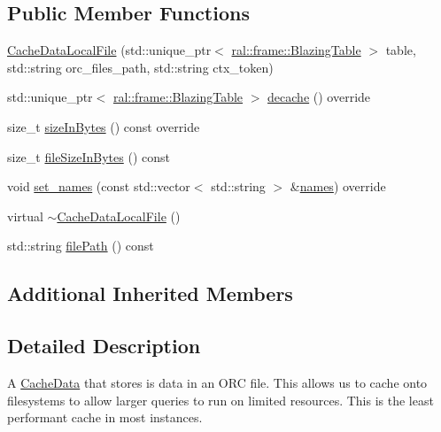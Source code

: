 \subsection*{Public Member Functions}
\begin{DoxyCompactItemize}
\item 
\hyperlink{classral_1_1cache_1_1CacheDataLocalFile_aa8f42a81e963c076ebdf7bc6bc53a323}{Cache\+Data\+Local\+File} (std\+::unique\+\_\+ptr$<$ \hyperlink{classral_1_1frame_1_1BlazingTable}{ral\+::frame\+::\+Blazing\+Table} $>$ table, std\+::string orc\+\_\+files\+\_\+path, std\+::string ctx\+\_\+token)
\item 
std\+::unique\+\_\+ptr$<$ \hyperlink{classral_1_1frame_1_1BlazingTable}{ral\+::frame\+::\+Blazing\+Table} $>$ \hyperlink{classral_1_1cache_1_1CacheDataLocalFile_a1d34227fbbf671e47119846ee2f2a0af}{decache} () override
\item 
size\+\_\+t \hyperlink{classral_1_1cache_1_1CacheDataLocalFile_ab0853eca16df1149f4ac0efbf3faa556}{size\+In\+Bytes} () const override
\item 
size\+\_\+t \hyperlink{classral_1_1cache_1_1CacheDataLocalFile_abc8a4d9edc7ffa21f15010c60a71189b}{file\+Size\+In\+Bytes} () const
\item 
void \hyperlink{classral_1_1cache_1_1CacheDataLocalFile_a49c8d137ef2d0a30ee59025f91725567}{set\+\_\+names} (const std\+::vector$<$ std\+::string $>$ \&\hyperlink{classral_1_1cache_1_1CacheData_aa2c8d58823d781cc1f8e6e589d897642}{names}) override
\item 
virtual \hyperlink{classral_1_1cache_1_1CacheDataLocalFile_a47567f8650eae4b66e44df7e06f3def9}{$\sim$\+Cache\+Data\+Local\+File} ()
\item 
std\+::string \hyperlink{classral_1_1cache_1_1CacheDataLocalFile_a21803499ee4d3ad088c2b5b81b91a042}{file\+Path} () const
\end{DoxyCompactItemize}
\subsection*{Additional Inherited Members}


\subsection{Detailed Description}
A \hyperlink{classral_1_1cache_1_1CacheData}{Cache\+Data} that stores is data in an O\+RC file. This allows us to cache onto filesystems to allow larger queries to run on limited resources. This is the least performant cache in most instances. 

